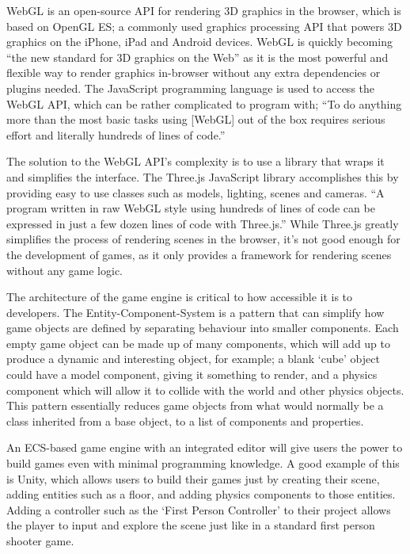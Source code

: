 WebGL is an open-source API for rendering 3D graphics in the browser, which is based on OpenGL ES; a commonly used graphics processing API that powers 3D graphics on the iPhone, iPad and Android devices.\cite{parisi2012webgl} WebGL is quickly becoming ``the new standard for 3D graphics on the Web''\cite[p2]{parisi2012webgl} as it is the most powerful and flexible way to render graphics in-browser without any extra dependencies or plugins needed. The JavaScript programming language is used to access the WebGL API, which can be rather complicated to program with; ``To do anything more than the most basic tasks using [WebGL] out of the box requires serious effort and literally hundreds of lines of code.''\cite[p44]{parisi2014programming}

The solution to the WebGL API's complexity is to use a library that wraps it and simplifies the interface. The Three.js\cite{threejs} JavaScript library accomplishes this by providing easy to use classes such as models, lighting, scenes and cameras. ``A program written in raw WebGL style using hundreds of lines of code can be expressed in just a few dozen lines of code with Three.js.''\cite[p57]{parisi2014programming} While Three.js greatly simplifies the process of rendering scenes in the browser, it's not good enough for the development of games, as it only provides a framework for rendering scenes without any game logic.

The architecture of the game engine is critical to how accessible it is to developers. The Entity-Component-System is a pattern that can simplify how game objects are defined by separating behaviour into smaller components. Each empty game object can be made up of many components, which will add up to produce a dynamic and interesting object, for example; a blank `cube' object could have a model component, giving it something to render, and a physics component which will allow it to collide with the world and other physics objects.\cite{gregory2014game} This pattern essentially reduces game objects from what would normally be a class inherited from a base object, to a list of components and properties.

An ECS-based game engine with an integrated editor will give users the power to build games even with minimal programming knowledge. A good example of this is Unity, which allows users to build their games just by creating their scene, adding entities such as a floor, and adding physics components to those entities.\cite{unitycreatingscenes} Adding a controller such as the `First Person Controller' to their project allows the player to input and explore the scene just like in a standard first person shooter game.\cite{unitycharactercontrol}


